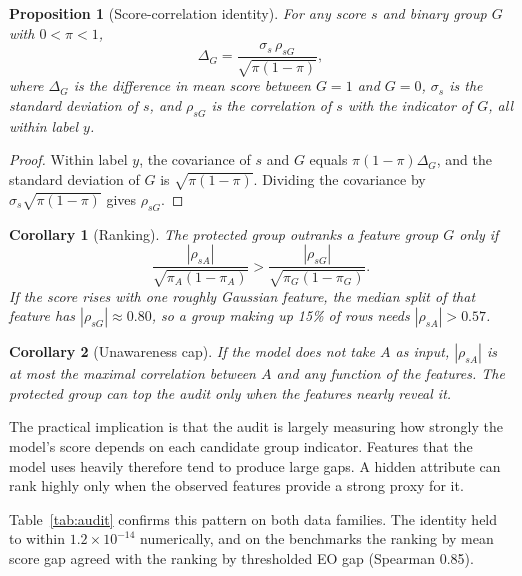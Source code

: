 \documentclass[conference]{IEEEtran}
\newtheorem{proposition}{Proposition}
\newtheorem{corollary}{Corollary}
\begin{document}
\begin{proposition}[Score-correlation identity]\label{prop:identity}
For any score $s$ and binary group $G$ with $0<\pi<1$,
\begin{equation}
\Delta_G=\frac{\sigma_s\,\rho_{sG}}{\sqrt{\pi(1-\pi)}},
\end{equation}
where $\Delta_G$ is the difference in mean score between $G=1$ and $G=0$, $\sigma_s$ is the standard deviation of $s$, and $\rho_{sG}$ is the correlation of $s$ with the indicator of $G$, all within label $y$.
\end{proposition}

\begin{proof}
Within label $y$, the covariance of $s$ and $G$ equals $\pi(1-\pi)\Delta_G$, and the standard deviation of $G$ is $\sqrt{\pi(1-\pi)}$. Dividing the covariance by $\sigma_s\sqrt{\pi(1-\pi)}$ gives $\rho_{sG}$.
\end{proof}

\begin{corollary}[Ranking]
The protected group outranks a feature group $G$ only if
\begin{equation}
\frac{|\rho_{sA}|}{\sqrt{\pi_A(1-\pi_A)}}>\frac{|\rho_{sG}|}{\sqrt{\pi_G(1-\pi_G)}}.
\end{equation}
If the score rises with one roughly Gaussian feature, the median split of that feature has $|\rho_{sG}|\approx0.80$, so a group making up 15\% of rows needs $|\rho_{sA}|>0.57$.
\end{corollary}

\begin{corollary}[Unawareness cap]
If the model does not take $A$ as input, $|\rho_{sA}|$ is at most the maximal correlation between $A$ and any function of the features. The protected group can top the audit only when the features nearly reveal it.
\end{corollary}

The practical implication is that the audit is largely measuring how strongly the model's score depends on each candidate group indicator. Features that the model uses heavily therefore tend to produce large gaps. A hidden attribute can rank highly only when the observed features provide a strong proxy for it.

Table~\ref{tab:audit} confirms this pattern on both data families. The identity held to within $1.2\times10^{-14}$ numerically, and on the benchmarks the ranking by mean score gap agreed with the ranking by thresholded EO gap (Spearman 0.85).
\end{document}
